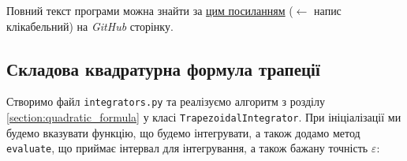 \documentclass[12pt]{extarticle}
\begin{document}
Повний текст програми можна знайти за \href{https://github.com/ZamDimon/University-Homeworks/tree/main/Term%205/Numerical%20Analysis/code/lab_4}{цим посиланням} ($\leftarrow$ напис клікабельний) на \textit{GitHub} сторінку.


\subsection{Складова квадратурна формула трапеції}

Створимо файл \texttt{integrators.py} та реалізуємо алгоритм з розділу \ref{section:quadratic_formula} у класі \texttt{TrapezoidalIntegrator}. При ініціалізації ми будемо вказувати функцію, що будемо інтегрувати, а також додамо метод \texttt{evaluate}, що приймає інтервал для інтегрування, а також бажану точність $\varepsilon$:
\end{document}
